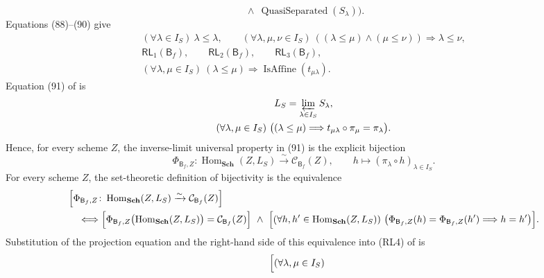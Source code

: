 \begin{definition}
\[        \ \wedge\
        \operatorname{QuasiSeparated}(S_\lambda)
      \bigr).                                                       \tag{F0c}
  \]
  Equations (88)--(90) give
  \[
  \begin{gathered}
    (\forall\lambda\in I_S)\ \lambda\leq\lambda,\qquad
    (\forall\lambda,\mu,\nu\in I_S)\
      ((\lambda\leq\mu)\wedge(\mu\leq\nu))
        \Longrightarrow\lambda\leq\nu,\\
    \mathsf{RL}_1(\mathsf B_f),\qquad
    \mathsf{RL}_2(\mathsf B_f),\qquad
    \mathsf{RL}_3(\mathsf B_f),\\
    (\forall\lambda,\mu\in I_S)\
      (\lambda\leq\mu)\Longrightarrow
      \operatorname{IsAffine}(t_{\mu\lambda}).
  \end{gathered}                                                    \tag{F0d}
  \]
  Equation (91) of  is
  \[
  \begin{gathered}
    L_S=\varprojlim_{\lambda\in I_S}S_\lambda,\\
    (\forall\lambda,\mu\in I_S)\
      \bigl((\lambda\leq\mu)\Longrightarrow
        t_{\mu\lambda}\circ\pi_\mu=\pi_\lambda\bigr).
  \end{gathered}
  \]
  Hence, for every scheme $Z$, the inverse-limit universal property in (91)
  is the explicit bijection
  \[
    \Phi_{\mathsf B_f,Z}\colon
      \operatorname{Hom}_{\mathbf{Sch}}(Z,L_S)
        \xrightarrow{\sim}\mathcal C_{\mathsf B_f}(Z),
    \qquad
    h\longmapsto(\pi_\lambda\circ h)_{\lambda\in I_S}.
  \]
  For every scheme $Z$, the set-theoretic definition of bijectivity is the
  equivalence
  \[
  \begin{aligned}
    &\Bigl[
      \Phi_{\mathsf B_f,Z}\colon
        \operatorname{Hom}_{\mathbf{Sch}}(Z,L_S)
          \xrightarrow{\sim}\mathcal C_{\mathsf B_f}(Z)
    \Bigr]\\
    &\quad\Longleftrightarrow
    \Bigl[
      \Phi_{\mathsf B_f,Z}
        \bigl(\operatorname{Hom}_{\mathbf{Sch}}(Z,L_S)\bigr)
        =\mathcal C_{\mathsf B_f}(Z)
    \Bigr]
    \ \wedge\
    \Bigl[
      (\forall h,h'\in\operatorname{Hom}_{\mathbf{Sch}}(Z,L_S))\
      \bigl(
        \Phi_{\mathsf B_f,Z}(h)=\Phi_{\mathsf B_f,Z}(h')
        \Longrightarrow h=h'
      \bigr)
    \Bigr].
  \end{aligned}
  \]
  Substitution of the projection equation and the right-hand side of this
  equivalence into (RL4) of
   is
  \[
  \begin{aligned}
    &\Bigl[
      (\forall\lambda,\mu\in I_S)\

\end{aligned}\]
\end{definition}

